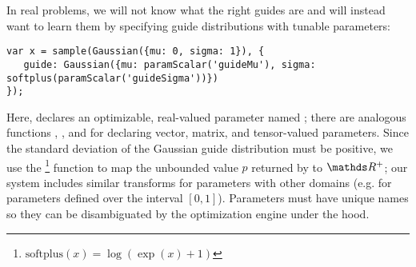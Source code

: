 In real problems, we will not know what the right guides are and will instead want to learn them by specifying guide distributions with tunable parameters:
\begin{lstlisting}
var x = sample(Gaussian({mu: 0, sigma: 1}), {
   guide: Gaussian({mu: paramScalar('guideMu'), sigma: softplus(paramScalar('guideSigma'))})
});
\end{lstlisting}
Here,  declares an optimizable, real-valued parameter named ; there are analogous functions , , and  for declaring vector, matrix, and tensor-valued parameters.
Since the standard deviation  of the Gaussian guide distribution must be positive, we use the \footnote{$\text{softplus}(x) = \log(\exp(x) + 1)$} function to map the unbounded value $p$ returned by  to $\Reals^{+}$; our system includes similar transforms for parameters with other domains (e.g.  for parameters defined over the interval $[0, 1]$).
Parameters must have unique names so they can be disambiguated by the optimization engine under the hood.

